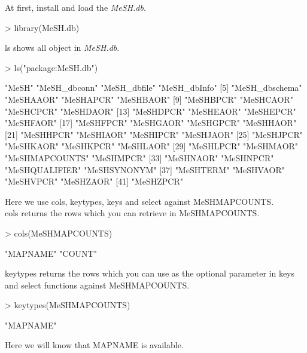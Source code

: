 \documentclass[11pt]{article}
\newcommand{\Rpackage}[1]{{\textit{#1}}}
\begin{document}
At first, install and load the \Rpackage{MeSH.db}.
\begin{center}
\begin{Schunk}
\begin{Sinput}
> library(MeSH.db)
\end{Sinput}
\end{Schunk}
\end{center}


ls shows all object in \Rpackage{MeSH.db}.
\begin{center}
\begin{Schunk}
\begin{Sinput}
> ls("package:MeSH.db")
\end{Sinput}
\begin{Soutput}
 [1] "MeSH"          "MeSH_dbconn"   "MeSH_dbfile"   "MeSH_dbInfo"  
 [5] "MeSH_dbschema" "MeSHAAOR"      "MeSHAPCR"      "MeSHBAOR"     
 [9] "MeSHBPCR"      "MeSHCAOR"      "MeSHCPCR"      "MeSHDAOR"     
[13] "MeSHDPCR"      "MeSHEAOR"      "MeSHEPCR"      "MeSHFAOR"     
[17] "MeSHFPCR"      "MeSHGAOR"      "MeSHGPCR"      "MeSHHAOR"     
[21] "MeSHHPCR"      "MeSHIAOR"      "MeSHIPCR"      "MeSHJAOR"     
[25] "MeSHJPCR"      "MeSHKAOR"      "MeSHKPCR"      "MeSHLAOR"     
[29] "MeSHLPCR"      "MeSHMAOR"      "MeSHMAPCOUNTS" "MeSHMPCR"     
[33] "MeSHNAOR"      "MeSHNPCR"      "MeSHQUALIFIER" "MeSHSYNONYM"  
[37] "MeSHTERM"      "MeSHVAOR"      "MeSHVPCR"      "MeSHZAOR"     
[41] "MeSHZPCR"     
\end{Soutput}
\end{Schunk}
\end{center}

Here we use cols, keytypes, keys and select against MeSHMAPCOUNTS.\\

cols returns the rows which you can retrieve in MeSHMAPCOUNTS.
\begin{center}
\begin{Schunk}
\begin{Sinput}
> cols(MeSHMAPCOUNTS)
\end{Sinput}
\begin{Soutput}
[1] "MAPNAME" "COUNT"  
\end{Soutput}
\end{Schunk}
\end{center}


keytypes returns the rows which you can use as the optional parameter in keys and select functions against MeSHMAPCOUNTS.
\begin{center}
\begin{Schunk}
\begin{Sinput}
> keytypes(MeSHMAPCOUNTS)
\end{Sinput}
\begin{Soutput}
[1] "MAPNAME"
\end{Soutput}
\end{Schunk}
\end{center}
Here we will know that MAPNAME is available.
\end{document}
